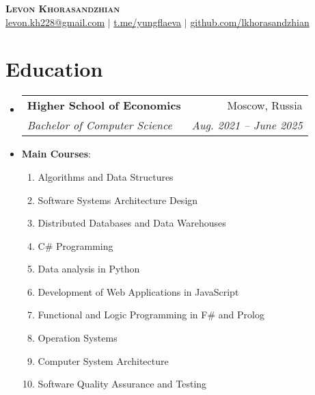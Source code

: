 \documentclass[letterpaper,11pt]{article}
\makeatletter
\newcommand{\resumeItem}[1]{
  \item\small{
    {#1 \vspace{-2pt}}
  }
}
\newcommand{\resumeSubheading}[4]{
  \vspace{-2pt}\item
    \begin{tabular*}{0.97\textwidth}[t]{l@{\extracolsep{\fill}}r}
      \textbf{#1} & #2 \\
      \textit{\small#3} & \textit{\small #4} \\
    \end{tabular*}\vspace{-7pt}
}
\newcommand{\resumeSubHeadingListStart}{\begin{itemize}[leftmargin=0.15in, label={}]}
\newcommand{\resumeSubHeadingListEnd}{\end{itemize}}
\makeatother
\begin{document}

\begin{center}
    \textbf{\Huge \scshape Levon Khorasandzhian} \\ \vspace{1pt}
    \href{mailto:levon.kh228@gmail.com}{{levon.kh228@gmail.com}} $|$ 
    \href{https://t.me/yungflaeva}{{t.me/yungflaeva}} $|$
    \href{https://github.com/lkhorasandzhian}{{github.com/lkhorasandzhian}}
\end{center}


\section{Education}
  \resumeSubHeadingListStart
    \resumeSubheading
      {Higher School of Economics}{Moscow, Russia}
      {Bachelor of Computer Science}{Aug. 2021 -- June 2025}
      \resumeItem
    {\textbf{Main Courses}:
    \begin{enumerate}
        \item Algorithms and Data Structures
        \item Software Systems Architecture Design
        \item Distributed Databases and Data Warehouses
        \item C\# Programming
        \item Data analysis in Python
        \item Development of Web Applications in JavaScript
        \item Functional and Logic Programming in F\# and Prolog
        \item Operation Systems
        \item Computer System Architecture
        \item Software Quality Assurance and Testing
    \end{enumerate}
    }
  \resumeSubHeadingListEnd

\end{document}
